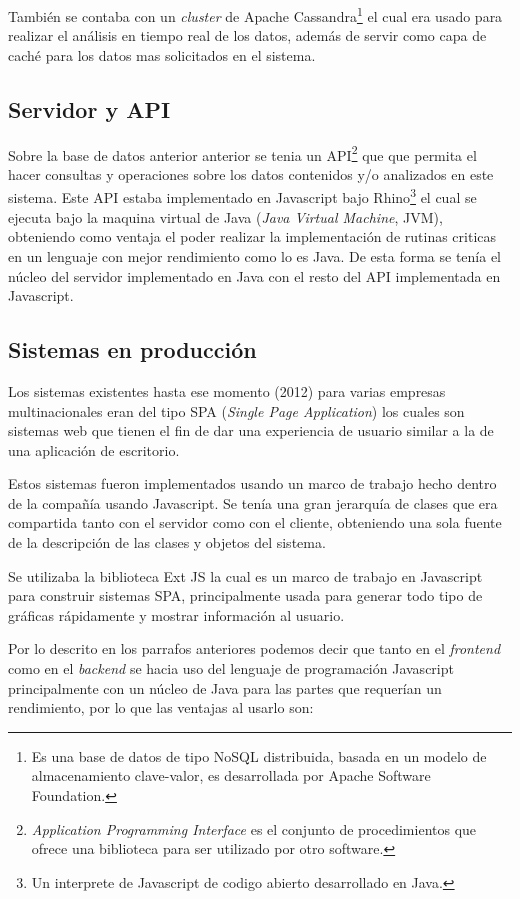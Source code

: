 También se contaba con un \textit{cluster} de Apache Cassandra\footnote{Es
  una base de datos de tipo NoSQL distribuida, basada en un modelo de almacenamiento
clave-valor, es desarrollada por Apache Software Foundation.}
el cual era usado para realizar el análisis en tiempo real de los datos,
además de servir como capa de caché para los datos mas solicitados en el sistema.

\subsection{Servidor y API}
Sobre la base de datos anterior anterior se tenia un API\footnote{
  \textit{Application Programming Interface} es el conjunto de procedimientos
  que ofrece una biblioteca para ser utilizado por otro software.}
que que permita el hacer consultas y operaciones sobre los datos contenidos
y/o analizados en este sistema.
Este API estaba implementado en Javascript bajo Rhino\footnote{Un interprete
  de Javascript de codigo abierto desarrollado en Java.}
el cual se ejecuta bajo la maquina virtual de Java (\textit{Java Virtual Machine},
JVM), obteniendo como ventaja el poder realizar la implementación de rutinas
criticas en un lenguaje con mejor rendimiento como lo es Java. De esta forma
se tenía el núcleo del servidor implementado en Java con el resto del API
implementada en Javascript.

\subsection{Sistemas en producción}
Los sistemas existentes hasta ese momento (2012) para varias empresas multinacionales
eran del tipo SPA (\textit{Single Page Application}) los cuales son sistemas web
que tienen el fin de dar una experiencia de usuario similar a la
de una aplicación de escritorio.

Estos sistemas fueron implementados usando un marco de trabajo hecho dentro
de la compañía usando Javascript. Se tenía una gran jerarquía de clases
que era compartida tanto con el servidor como con el cliente, obteniendo una
sola fuente de la descripción de las clases y objetos del sistema.

Se utilizaba la biblioteca Ext JS la cual es un marco de trabajo
en Javascript para construir sistemas SPA, principalmente usada para generar
todo tipo de gráficas rápidamente y mostrar información al usuario.

Por lo descrito en los parrafos anteriores podemos decir que tanto en el
\textit{frontend} como en el \textit{backend} se hacia uso del lenguaje
de programación Javascript principalmente con un núcleo de Java para las partes
que requerían un rendimiento, por lo que las ventajas al usarlo son:

